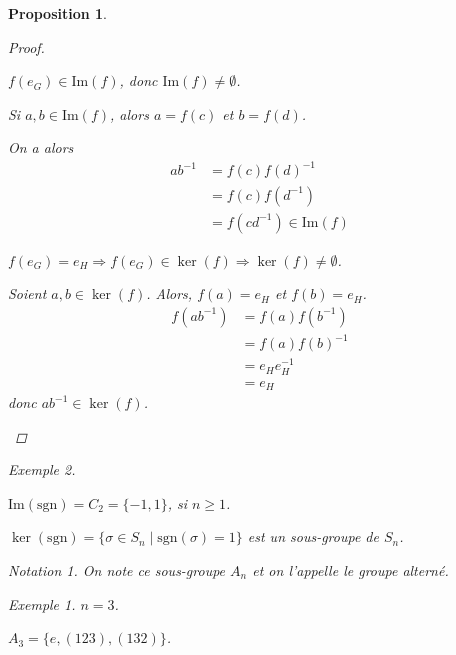 \documentclass{report}
\newcommand*{\gte}{\geqslant}
\newtheorem*{prop}{Proposition}
\theoremstyle{definition}
\theoremstyle{remark}
\newtheorem*{exem}{Exemple}
\newtheorem*{nota}{Notation}
\begin{document}
\begin{prop}
\begin{proof}
			\begin{nlist}
				\item $f(e_G) \in \mathrm{Im}(f)$, donc $\mathrm{Im}(f) \neq \emptyset$.

				Si $a,b \in \mathrm{Im}(f)$, alors $a=f(c)$ et $b=f(d)$.

				On a alors
				\begin{align*}
					ab^{-1}&= f(c)f(d)^{-1}\\
					&= f(c)f(d^{-1})\\
					&= f(cd^{-1}) \in \mathrm{Im}(f)
				\end{align*}
				\item $f(e_G) = e_H \Rightarrow f(e_G) \in \ker(f) \Rightarrow \ker(f) \neq \emptyset$.

				Soient $a,b \in \ker(f)$. Alors, $f(a)=e_H$ et $f(b)=e_H$.
				\begin{align*}
					f(ab^{-1})&= f(a)f(b^{-1})\\
					&= f(a)f(b)^{-1}\\
					&= e_H e_H^{-1}\\
					&= e_H
				\end{align*}
				donc $ab^{-1} \in \ker(f)$.
			\end{nlist}
		\end{proof}
		\begin{exem}~

			$\mathrm{Im}(\mathrm{sgn}) = C_2 = \{-1,1\}$, si $n \gte 1$.

			$\ker(\mathrm{sgn}) = \{\sigma \in S_n \mid \mathrm{sgn}(\sigma)=1\}$ est un sous-groupe de $S_n$.
			\begin{nota}
				On note ce sous-groupe $A_n$ et on l'appelle le \emph{groupe altern\'e}.
			\end{nota}
			\begin{exem}
				$n=3$.

				$A_3 = \{e,(123),(132)\}$.
			\end{exem}
		\end{exem}
	\end{prop}
\end{document}
